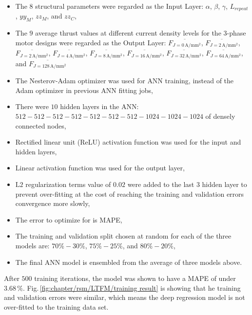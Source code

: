             
            \begin{itemize}
                \item The $8$ structural parameters were regarded as the Input Layer: $\alpha$, $\beta$, $\gamma$, $L_{repeat}$, $yy_M$, $zz_M$, and $zz_C$, 
                \item The $9$ average thrust values at different current density levels for the 3-phase motor designs were regarded as the Output Layer: $\overline{F_{J=0\,\mathrm{A/mm^2}}}$, $\overline{F_{J=2\,\mathrm{A/mm^2}}}$, $\overline{F_{J=2\,\mathrm{A/mm^2}}}$, $\overline{F_{J=4\,\mathrm{A/mm^2}}}$, $\overline{F_{J=8\,\mathrm{A/mm^2}}}$, $\overline{F_{J=16\,\mathrm{A/mm^2}}}$, $\overline{F_{J=32\,\mathrm{A/mm^2}}}$, $\overline{F_{J=64\,\mathrm{A/mm^2}}}$, and $\overline{F_{J=128\,\mathrm{A/mm^2}}}$
                \item The Nesterov-Adam optimizer was used for \acs{ANN} training, instead of the Adam optimizer in previous \acs{ANN} fitting jobs,
                \item There were $10$ hidden layers in the \acs{ANN}: $512-512-512-512-512-512-512-1024-1024-1024$ of densely connected nodes,
                \item Rectified linear unit (ReLU) activation function was used
for the input and hidden layers,
                \item Linear activation function was used for the output layer,
                \item $\mathrm{L2}$ regularization terms value of $0.02$ were added to the last $3$ hidden layer to prevent over-fitting at the cost of reaching the training and validation errors convergence more slowly,
                \item The error to optimize for is \acs{MAPE},
                \item The training and validation split chosen at random for each of the three models are: $70\%-30\%$, $75\%-25\%$, and $80\%-20\%$,
                \item The final \acs{ANN} model is ensembled from the average of three models above.
            \end{itemize}
            
            
            After $500$ training iterations, the model was shown to have a \acf{MAPE} of under $3.68\,\%$. Fig.\,\ref{fig:chapter/rsm/LTFM/training result} is showing that he training and validation errors were similar, which means the deep regression model is not over-fitted to the training data set.
            
